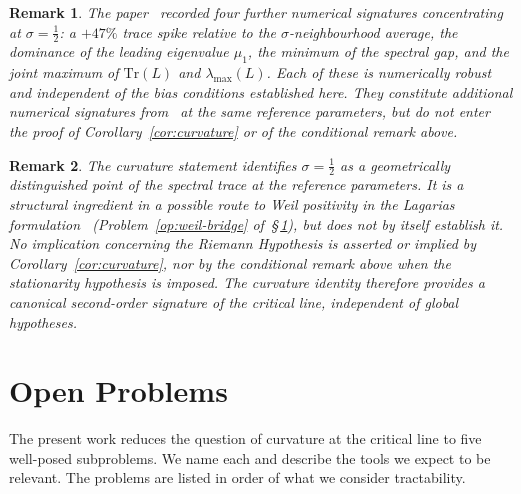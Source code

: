 \documentclass[11pt]{article}
\newtheorem*{remark}{Remark}
\begin{document}
\begin{remark}
The paper~\cite{Paper5} recorded four further numerical signatures
concentrating at $\sigma=\tfrac12$: a $+47\%$ trace spike relative to
the $\sigma$-neighbourhood average, the dominance of the leading
eigenvalue $\mu_1$, the minimum of the spectral gap, and the joint
maximum of $\mathrm{Tr}(L)$ and $\lambda_{\max}(L)$.
Each of these is numerically robust and independent of the bias
conditions established here.
They constitute additional numerical signatures from~\cite{Paper5} at
the same reference parameters, but do not enter the proof of
Corollary~\ref{cor:curvature} or of the conditional remark above.
\end{remark}

\begin{remark}
The curvature statement identifies $\sigma=\tfrac12$ as a geometrically
distinguished point of the spectral trace at the reference parameters.
It is a structural ingredient in a possible route to Weil positivity
in the Lagarias formulation~\cite{Lagarias}
(Problem~\ref{op:weil-bridge} of~\S\,\ref{sec:open}), but does not by
itself establish it.
No implication concerning the Riemann Hypothesis is asserted or
implied by Corollary~\ref{cor:curvature}, nor by the conditional remark
above when the stationarity hypothesis is imposed.
The curvature identity therefore provides a canonical second-order
signature of the critical line, independent of global hypotheses.
\end{remark}

\section{Open Problems}
\label{sec:open}

The present work reduces the question of curvature at the critical
line to five well-posed subproblems.
We name each and describe the tools we expect to be relevant.
The problems are listed in order of what we consider tractability.
\end{document}
